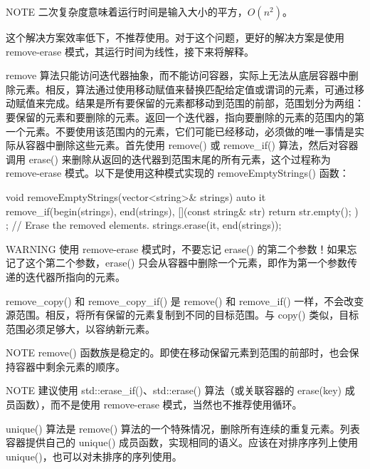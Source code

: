\begin{myNotic}{NOTE}
二次复杂度意味着运行时间是输入大小的平方，$O(n^2)$。
\end{myNotic}

这个解决方案效率低下，不推荐使用。对于这个问题，更好的解决方案是使用 remove-erase 模式，其运行时间为线性，接下来将解释。

remove 算法只能访问迭代器抽象，而不能访问容器，实际上无法从底层容器中删除元素。相反，算法通过使用移动赋值来替换匹配给定值或谓词的元素，可通过移动赋值来完成。结果是所有要保留的元素都移动到范围的前部，范围划分为两组：要保留的元素和要删除的元素。返回一个迭代器，指向要删除的元素的范围内的第一个元素。不要使用该范围内的元素，它们可能已经移动，必须做的唯一事情是实际从容器中删除这些元素。首先使用 remove() 或 remove\_if() 算法，然后对容器调用 erase() 来删除从返回的迭代器到范围末尾的所有元素，这个过程称为 remove-erase 模式。以下是使用这种模式实现的 removeEmptyStrings() 函数：

\begin{cpp}
void removeEmptyStrings(vector<string>& strings)
{
    auto it { remove_if(begin(strings), end(strings),
        [](const string& str){ return str.empty(); }) };
    // Erase the removed elements.
    strings.erase(it, end(strings));
}
\end{cpp}

\begin{myWarning}{WARNING}
使用 remove-erase 模式时，不要忘记 erase() 的第二个参数！如果忘记了这个第二个参数，erase() 只会从容器中删除一个元素，即作为第一个参数传递的迭代器所指向的元素。
\end{myWarning}

remove\_copy() 和 remove\_copy\_if() 是 remove() 和 remove\_if() 一样，不会改变源范围。相反，将所有保留的元素复制到不同的目标范围。与 copy() 类似，目标范围必须足够大，以容纳新元素。

\begin{myNotic}{NOTE}
remove() 函数族是稳定的。即使在移动保留元素到范围的前部时，也会保持容器中剩余元素的顺序。
\end{myNotic}

\begin{myNotic}{NOTE}
建议使用 std::erase\_if()、std::erase() 算法（或关联容器的 erase(key) 成员函数），而不是使用 remove-erase 模式，当然也不推荐使用循环。
\end{myNotic}


unique() 算法是 remove() 算法的一个特殊情况，删除所有连续的重复元素。列表容器提供自己的 unique() 成员函数，实现相同的语义。应该在对排序序列上使用 unique()，也可以对未排序的序列使用。

